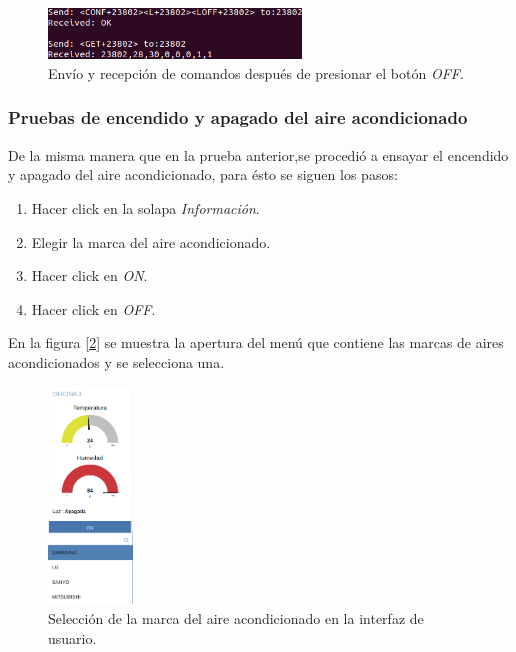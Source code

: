 \begin{figure}[h!]
	\centering
	\includegraphics[width=0.6\textwidth]{./Figures/interfaz61.png}
	\caption{Envío y recepción de comandos después de presionar el botón {\textit{OFF}}.}
	\label{fig:interfaz61}
\end{figure}


\subsubsection{Pruebas de encendido y apagado del aire acondicionado}

De la misma manera que en la prueba anterior,se procedió a ensayar el encendido y apagado del aire acondicionado, para ésto se siguen los pasos:

\begin{enumerate}
\item Hacer click en la solapa {\textit{Información}}.
\item Elegir la marca del aire acondicionado.
\item Hacer click en {\textit{ON}}.
\item Hacer click en {\textit{OFF}}.
\end{enumerate}

En la figura [\ref{fig:interfaz71}] se muestra la apertura del menú que contiene las marcas de aires acondicionados y se selecciona una.
%
\begin{figure}[h!]
	\centering
	\includegraphics[width=0.2\textwidth]{./Figures/interfaz71.png}
	\caption{Selección de la marca del aire acondicionado en la interfaz de usuario.}
	\label{fig:interfaz71}
\end{figure}

